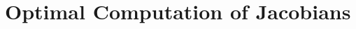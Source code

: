 \documentclass{birkjour}
\numberwithin{equation}{section}
\begin{document}



\section{Optimal Computation of Jacobians}
\end{document}

